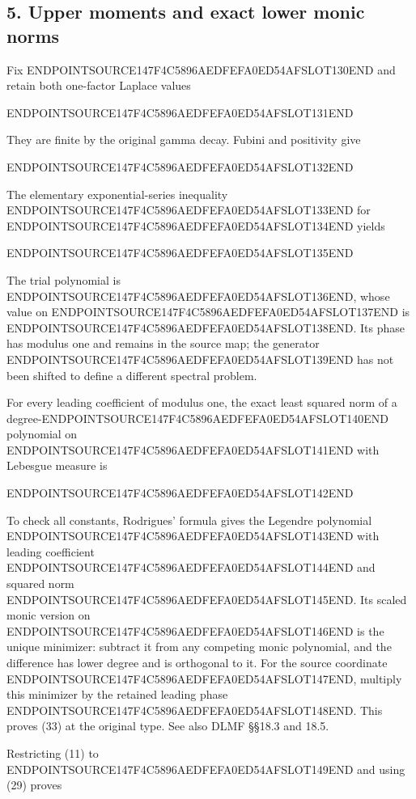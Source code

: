 \subsection{5. Upper moments and exact lower monic norms}\label{endpoint-arithmetic_original--upper-moments-and-exact-lower-monic-norms}

Fix ENDPOINTSOURCE147F4C5896AEDFEFA0ED54AFSLOT130END and retain both one-factor Laplace values

ENDPOINTSOURCE147F4C5896AEDFEFA0ED54AFSLOT131END

They are finite by the original gamma decay. Fubini and positivity give

ENDPOINTSOURCE147F4C5896AEDFEFA0ED54AFSLOT132END

The elementary exponential-series inequality ENDPOINTSOURCE147F4C5896AEDFEFA0ED54AFSLOT133END for ENDPOINTSOURCE147F4C5896AEDFEFA0ED54AFSLOT134END yields

ENDPOINTSOURCE147F4C5896AEDFEFA0ED54AFSLOT135END

The trial polynomial is ENDPOINTSOURCE147F4C5896AEDFEFA0ED54AFSLOT136END, whose value on ENDPOINTSOURCE147F4C5896AEDFEFA0ED54AFSLOT137END is ENDPOINTSOURCE147F4C5896AEDFEFA0ED54AFSLOT138END. Its phase has modulus one and remains in the source map; the generator ENDPOINTSOURCE147F4C5896AEDFEFA0ED54AFSLOT139END has not been shifted to define a different spectral problem.

For every leading coefficient of modulus one, the exact least squared norm of a degree-ENDPOINTSOURCE147F4C5896AEDFEFA0ED54AFSLOT140END polynomial on ENDPOINTSOURCE147F4C5896AEDFEFA0ED54AFSLOT141END with Lebesgue measure is

ENDPOINTSOURCE147F4C5896AEDFEFA0ED54AFSLOT142END

To check all constants, Rodrigues' formula gives the Legendre polynomial ENDPOINTSOURCE147F4C5896AEDFEFA0ED54AFSLOT143END with leading coefficient ENDPOINTSOURCE147F4C5896AEDFEFA0ED54AFSLOT144END and squared norm ENDPOINTSOURCE147F4C5896AEDFEFA0ED54AFSLOT145END. Its scaled monic version on ENDPOINTSOURCE147F4C5896AEDFEFA0ED54AFSLOT146END is the unique minimizer: subtract it from any competing monic polynomial, and the difference has lower degree and is orthogonal to it. For the source coordinate ENDPOINTSOURCE147F4C5896AEDFEFA0ED54AFSLOT147END, multiply this minimizer by the retained leading phase ENDPOINTSOURCE147F4C5896AEDFEFA0ED54AFSLOT148END. This proves (33) at the original type. See also DLMF §§18.3 and 18.5.

Restricting (11) to ENDPOINTSOURCE147F4C5896AEDFEFA0ED54AFSLOT149END and using (29) proves

